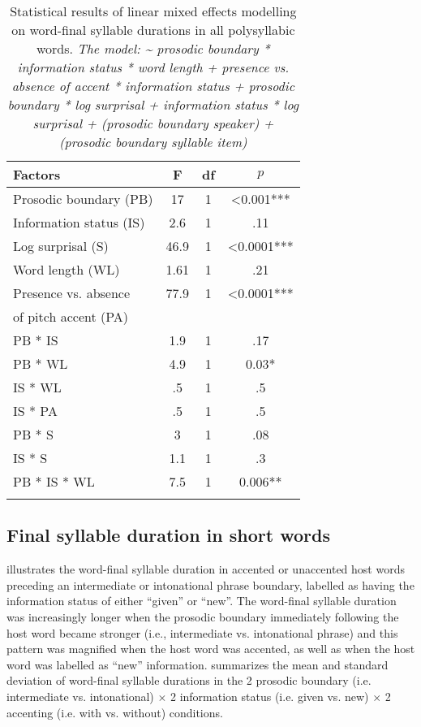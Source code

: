 \documentclass[output=paper,colorlinks,citecolor=brown]{langscibook}
\begin{document}
\begin{table}
\begin{tabular}{l S[table-format=2.1] c S[table-format=<1.4{***}]}
\lsptoprule
{Factors} & {F} & {df} & $p$\\ \midrule
Prosodic boundary (PB)  & 17   & 1 & <0.001{***}\\
Information status (IS) & 2.6  & 1 & .11\\
Log surprisal (S)       & 46.9 & 1 & <0.0001{***}\\
Word length (WL)        & 1.61 & 1 & .21\\
Presence vs. absence    & 77.9 & 1 & <0.0001{***}\\
\quad of pitch accent (PA)    & \\
PB * IS      & 1.9 & 1 & .17\\
PB * WL      & 4.9 & 1 & 0.03{*}\\
IS * WL      & .5  & 1 & .5\\
IS * PA      & .5  & 1 & .5\\
PB * S       & 3   & 1 & .08\\
IS * S       & 1.1 & 1 & .3\\
PB * IS * WL & 7.5 & 1 & 0.006{**}\\
\lspbottomrule
\end{tabular}
\caption{Statistical results of linear mixed effects modelling on word-final syllable durations in all polysyllabic words. \textit{The model: {\textasciitilde} prosodic boundary * information status * word length + presence vs. absence of accent * information status + prosodic boundary * log surprisal + information status * log surprisal + (prosodic boundary {\textbar} speaker) + (prosodic boundary {\textbar} syllable item)}}
\label{table:Table1}
\end{table}

\subsection{Final syllable duration in short words}
 illustrates the word-final syllable duration in accented or unaccented host words preceding an intermediate or intonational phrase boundary, labelled as having the information status of either “given” or “new”. The word-final syllable duration was increasingly longer when the prosodic boundary immediately following the host word became stronger (i.e., intermediate vs. intonational phrase) and this pattern was magnified when the host word was accented, as well as when the host word was labelled as “new” information.  summarizes the mean and standard deviation of word-final syllable durations in the 2 prosodic boundary (i.e. intermediate vs. intonational) $\times$ 2 information status (i.e. given vs. new) $\times$ 2 accenting (i.e. with vs. without) conditions.
\end{document}
